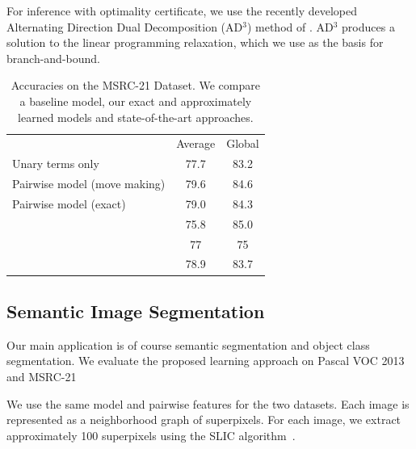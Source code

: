For inference with optimality certificate, we use the recently developed
Alternating Direction Dual Decomposition (AD$^3$) method of
\citet{martins2011augmented}. AD$^3$ produces a solution to the linear
programming relaxation, which we use as the basis for branch-and-bound.

\begin{table}
    \begin{center}
    \begin{tabularx}{\linewidth}{@{\extracolsep{\fill}}lcc}
        \toprule
                    & Average & Global \\
        \cmidrule{1-3}
    Unary terms only & 77.7& 83.2 \\
    Pairwise model (move making)& 79.6&84.6\\
    Pairwise model (exact)& 79.0 & 84.3\\
        \cmidrule{1-3}
    \citet{ladicky2009associative} & 75.8& 85.0\\
    \citet{gonfaus2010harmony} & 77&  75\\
    \citet{lucchi2013learning} & 78.9& 83.7\\
    \bottomrule
    \end{tabularx}
    \end{center}
    \caption{Accuracies on the MSRC-21 Dataset.  We compare a baseline model,
    our exact and approximately learned models and state-of-the-art
    approaches.\label{msrcacc}}
    
\end{table}




\subsection{Semantic Image Segmentation}
Our main application is of course semantic segmentation and object class
segmentation. We evaluate the proposed learning approach on Pascal VOC 2013 and
MSRC-21

We use the same model and pairwise features for the two datasets.
Each image is represented as a neighborhood graph of superpixels.
For each image, we extract approximately 100 superpixels using 
the SLIC algorithm~\citep{achanta2012slic}.

